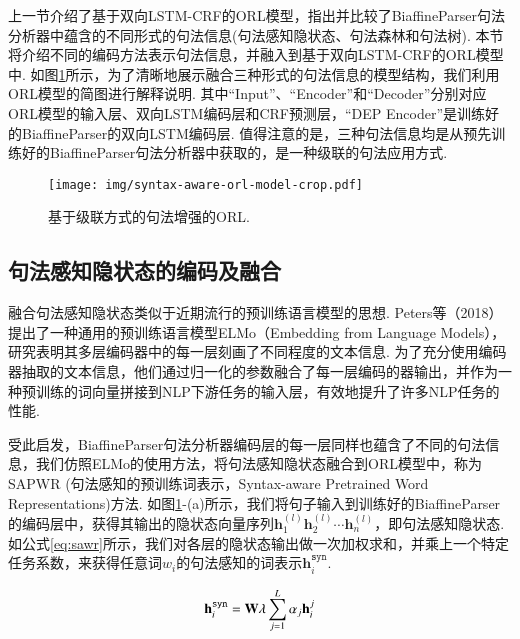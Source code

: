 上一节介绍了基于双向LSTM-CRF的ORL模型，指出并比较了BiaffineParser句法分析器中蕴含的不同形式的句法信息(句法感知隐状态、句法森林和句法树).
本节将介绍不同的编码方法表示句法信息，并融入到基于双向LSTM-CRF的ORL模型中.
如图\ref{fig:orl_pipeline}所示，为了清晰地展示融合三种形式的句法信息的模型结构，我们利用ORL模型的简图进行解释说明. 其中“Input”、“Encoder”和“Decoder”分别对应ORL模型的输入层、双向LSTM编码层和CRF预测层，“DEP Encoder”是训练好的BiaffineParser的双向LSTM编码层.
值得注意的是，三种句法信息均是从预先训练好的BiaffineParser句法分析器中获取的，是一种级联的句法应用方式.

\begin{figure}[hb!]
    \centering
    \texttt{[image: img/syntax-aware-orl-model-crop.pdf]}
    \caption{基于级联方式的句法增强的ORL. }
    \label{fig:orl_pipeline}
\end{figure}
\subsection{句法感知隐状态的编码及融合}
融合句法感知隐状态类似于近期流行的预训练语言模型的思想. Peters等（2018）提出了一种通用的预训练语言模型ELMo（Embedding from Language Models），研究表明其多层编码器中的每一层刻画了不同程度的文本信息. 为了充分使用编码器抽取的文本信息，他们通过归一化的参数融合了每一层编码的器输出，并作为一种预训练的词向量拼接到NLP下游任务的输入层，有效地提升了许多NLP任务的性能.

受此启发，BiaffineParser句法分析器编码层的每一层同样也蕴含了不同的句法信息，我们仿照ELMo的使用方法，将句法感知隐状态融合到ORL模型中，称为SAPWR (句法感知的预训练词表示，Syntax-aware Pretrained Word Representations)方法. 如图\ref{fig:orl_pipeline}-(a)所示，我们将句子输入到训练好的BiaffineParser的编码层中，获得其输出的隐状态向量序列$\mathbf{h}_1^{(l)}\mathbf{h}_2^{(l)} \cdots \mathbf{h}_n^{(l)}$，即句法感知隐状态. 如公式\ref{eq:sawr}所示，我们对各层的隐状态输出做一次加权求和，并乘上一个特定任务系数，来获得任意词$w_i$的句法感知的词表示$\mathbf{h}_i^{\texttt{syn}}$.


\begin{equation}
    \setlength{\abovedisplayskip}{9pt}
    \setlength{\belowdisplayskip}{9pt}
    \label{eq:sawr}
    \mathbf{h}_i^{\texttt{syn}} = \mathbf{W} \lambda \sum_{j=1}^{L}\alpha_j \mathbf{h}_i^j
\end{equation}

